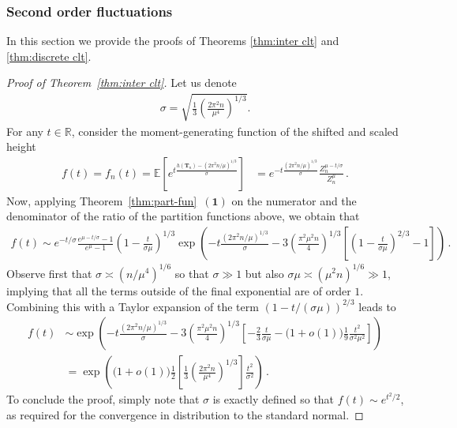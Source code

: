 \documentclass{article}
\newcommand{\E}{\mathbb{E}}								%
\newcommand{\1}{\mathbbm{1}}								%
\theoremstyle{definition}
\numberwithin{equation}{section}
\newcommand{\bT}{\mathbf T}
\newcommand{\R}{\mathbb R}
\newcommand{\numitem}[1]{$\mathbf{(#1)}$}
\begin{document}
\subsubsection{Second order fluctuations}
In this section we provide the proofs of Theorems \ref{thm:inter clt} and \ref{thm:discrete clt}.
\begin{proof}[Proof of Theorem~\ref{thm:inter clt}]
Let us denote
\begin{align*}
    \sigma=\sqrt{\frac{1}{3}\left(\frac{2\pi^2n}{\mu^4}\right)^{1/3}}.
\end{align*}
For any $t\in\R$, consider the moment-generating function of the shifted and scaled height
    \begin{align*}
        f(t)=f_n(t)=\E\left[e^{t\frac{h(\bT_n)-(2\pi^2n/\mu)^{1/3}}{\sigma}}\right]&=e^{-t\frac{(2\pi^2n / \mu)^{1/3}}{\sigma}}\frac{Z_n^{\mu-t/\sigma}}{Z_n^\mu}\,.
    \end{align*}
    Now, applying Theorem~\ref{thm:part-fun}~\numitem{1} on the numerator and the denominator of the ratio of the partition functions above, we obtain that
    \begin{align*}
        f(t)\sim e^{-t/\sigma}\frac{e^{\mu-t/\sigma}-1}{e^\mu-1}\left(1-\frac{t}{\sigma\mu}\right)^{1/3}\exp\left(-t\frac{(2\pi^2n/\mu)^{1/3}}{\sigma}-3\left(\frac{\pi^2\mu^2n}{4}\right)^{1/3}\left[\left(1-\frac{t}{\sigma\mu}\right)^{2/3}-1\right]\right)\,.
    \end{align*}
    Observe first that $\sigma\asymp (n/\mu^4)^{1/6}$ so that $\sigma\gg1$ but also $\sigma\mu\asymp (\mu^2n)^{1/6}\gg1$, implying that all the terms outside of the final exponential are of order $1$.
    Combining this with a Taylor expansion of the term $(1-t/(\sigma\mu))^{2/3}$ leads to
    \begin{align*}
        f(t)&\sim\exp\left(-t\frac{(2\pi^2n/\mu)^{1/3}}{\sigma}-3\left(\frac{\pi^2\mu^2n}{4}\right)^{1/3}\left[-\frac{2}{3}\frac{t}{\sigma\mu}-\big(1+o(1)\big)\frac{1}{9}\frac{t^2}{\sigma^2\mu^2}\right]\right)\\
        &=\exp\left(\big(1+o(1)\big)\frac{1}{2}\left[\frac{1}{3}\left(\frac{2\pi^2n}{\mu^4}\right)^{1/3}\right]\frac{t^2}{\sigma^2}\right)\,.
    \end{align*}
    To conclude the proof, simply note that $\sigma$ is exactly defined so that $f(t)\sim e^{t^2/2}$, as required for the convergence in distribution to the standard normal.
\end{proof}
\end{document}
